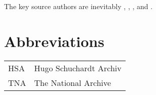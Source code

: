 \documentclass[output=paper]{langsci/langscibook}
\begin{document}
	The key source authors are inevitably \citet{Haedo1612}, \citet{Broughton1839}, \citet{Pananti1841}, and \citet{Frank1850}.

\section*{Abbreviations}	

\begin{tabularx}{.5\textwidth}{@{}lQ@{}}
HSA & Hugo Schuchardt Archiv\\
TNA & The National Archive \\ 
\end{tabularx}%

	{\sloppy\printbibliography[heading=subbibliography,notkeyword=this]}
\end{document}
